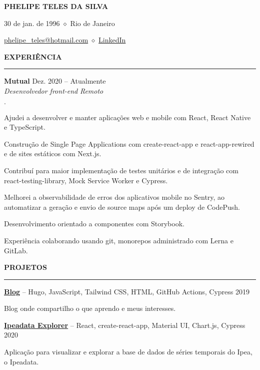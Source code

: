 \documentclass[11pt,letterpaper]{article}
\newenvironment{tightlist}
  {\begin{list}
    {$\cdot$}
    {
      \setlength{\leftmargin}{0em}
      \setlength{\itemsep}{-0.5em}
    }
    \smallskip
  }
{\end{list}}
\begin{document}
\pagestyle{empty}

\centerline{\huge\bf PHELIPE TELES DA SILVA}
\medskip

\centerline{30 de jan. de 1996 $\diamond$ Rio de Janeiro}
\smallskip

\centerline{
  \href{mailto:phelipe_teles@hotmail.com}{phelipe\_teles@hotmail.com}
  $\diamond$
  \href{https://linkedin.com/in/phelipeteles}{LinkedIn}
}
\smallskip

\medskip \textbf{EXPERIÊNCIA} \medskip
\hrule

\textbf{Mutual} \hfill Dez. 2020 -- Atualmente \\
\emph{Desenvolvedor front-end} \hfill \emph{Remoto} {\parfillskip=0pt\par}

\begin{tightlist}
  \item Ajudei a desenvolver e manter aplicações web e mobile com React, React
    Native e TypeScript.
  \item Construção de Single Page Applications com create-react-app e
    react-app-rewired e de sites estáticos com Next.js.
  \item Contribuí para maior implementação de testes unitários e de integração
    com react-testing-library, Mock Service Worker e Cypress.
  \item Melhorei a observabilidade de erros dos aplicativos mobile no Sentry, ao
    automatizar a geração e envio de source maps após um deploy de CodePush.
  \item Desenvolvimento orientado a componentes com Storybook.
  \item Experiência colaborando usando git, monorepos administrado com Lerna e
    GitLab.
\end{tightlist}

\medskip \textbf{PROJETOS} \medskip
\hrule

\textbf{\href{https://phelipetls.github.io}{Blog}} -- Hugo, JavaScript, Tailwind CSS, HTML, GitHub Actions, Cypress \hfill 2019
{\parfillskip=0pt\par}
Blog onde compartilho o que aprendo e meus interesses.

\medskip

\textbf{\href{http://ipeadata-explorer.surge.sh}{Ipeadata Explorer}} -- React, create-react-app, Material UI, Chart.js, Cypress \hfill 2020
{\parfillskip=0pt\par}
Aplicação para visualizar e explorar a base de dados de séries temporais
  do Ipea, o Ipeadata.
\end{document}
